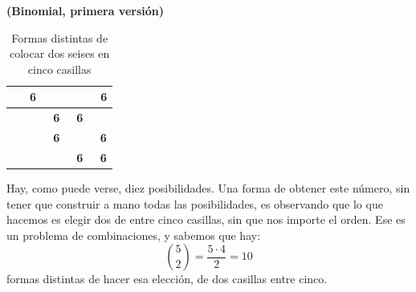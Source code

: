 \begin{Ejemplo}{\bf (Binomial, primera versión)}
\begin{table}[ht]
\begin{center}
{\begin{tabular}{|c|c|c|c|c|}
         &\mbox{ \bf 6}& & & \mbox{ \bf 6}\\
        \hline
         && \mbox{ \bf 6}&\mbox{ \bf 6} & \\
         \hline
         && \mbox{ \bf 6}& & \mbox{ \bf 6} \\
         \hline
         &&& \mbox{ \bf 6}& \mbox{ \bf 6} \\
         \hline
        \end{tabular}
        }
        \caption{Formas distintas de colocar dos seises en cinco casillas}\label{cap05:tabla:FormasColocarDosSeisesCincoCasillas}
        \end{center}
        \end{table}
    Hay, como puede verse, diez posibilidades. Una forma de obtener este número, sin tener que construir a mano todas las posibilidades, es observando que lo que hacemos es elegir dos de entre cinco casillas, sin que nos importe el orden. Ese es un problema de combinaciones, y sabemos que hay:
         \[\binom{5}{2}=\dfrac{5\cdot 4}{2}=10\]
    formas distintas de hacer esa elección, de dos casillas entre cinco.


\end{Ejemplo}
